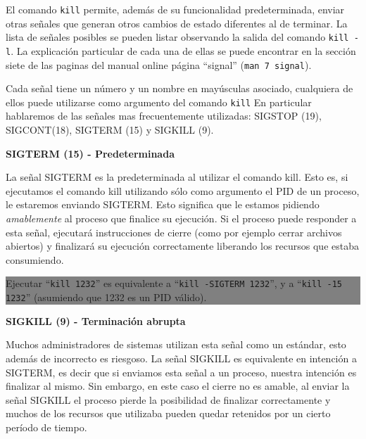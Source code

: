 \documentclass[12pt]{article}
\begin{document}
El comando \texttt{kill} permite, además de su funcionalidad predeterminada,
enviar otras señales que generan otros cambios de estado diferentes al de 
terminar. La lista de señales posibles se pueden listar observando la 
salida del comando \texttt{kill -l}. La explicación particular de cada 
una de ellas se puede encontrar en la sección siete de las paginas del 
manual online página ``signal'' (\texttt{man 7 signal}).  

Cada señal tiene un número y un nombre en mayúsculas asociado, cualquiera
de ellos puede utilizarse como argumento del comando \texttt{kill}  
En particular hablaremos de las señales mas frecuentemente utilizadas: 
SIGSTOP (19), SIGCONT(18), SIGTERM (15) y  SIGKILL (9).  

\textbf{SIGTERM (15) - Predeterminada}

La señal SIGTERM es la predeterminada al utilizar el comando kill. Esto 
es, si ejecutamos el comando kill utilizando sólo como argumento el PID 
de un proceso, le estaremos enviando SIGTERM. Esto significa que le estamos
pidiendo \textit{amablemente} al proceso que finalice su ejecución. 
Si el proceso puede responder a esta señal, ejecutará instrucciones de 
cierre (como por ejemplo cerrar archivos abiertos) y finalizará su 
ejecución correctamente liberando los recursos que estaba consumiendo. 

\colorbox{grey}{\parbox[t]{0.95\linewidth}{ \vspace*{0.5cm} { 
{\bf }
Ejecutar ``\texttt{kill 1232}'' es equivalente a ``\texttt{kill -SIGTERM 
1232}'', y a ``\texttt{kill -15 1232}'' (asumiendo que 1232 es un PID 
válido). 
} \vspace*{0.5cm} } } 

\textbf{SIGKILL (9) - Terminación abrupta}

Muchos administradores de sistemas utilizan esta señal como un estándar, 
esto además de incorrecto es riesgoso. La señal SIGKILL es equivalente en 
intención a SIGTERM, es decir que si enviamos esta señal a un proceso, 
nuestra intención es finalizar al mismo. Sin embargo, en este caso el
cierre no es amable, al enviar la señal SIGKILL el proceso pierde la 
posibilidad de finalizar correctamente y muchos de los recursos que 
utilizaba pueden quedar retenidos por un cierto período de tiempo.  


\end{document}

